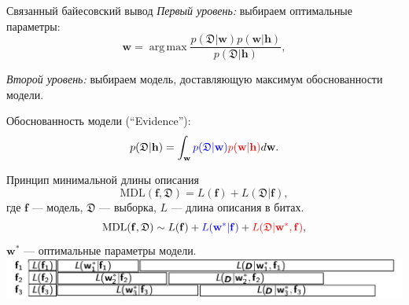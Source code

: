 \documentclass[usenames,dvipsnames,10pt,pdf,utf8,russian,aspectratio=43]{beamer}
\DeclareMathOperator*{\argmax}{arg\,max}
\begin{document}
\begin{frame}{Связанный байесовский вывод}
\textit{Первый уровень:} выбираем оптимальные параметры:
\[
    \mathbf{w} = \argmax \frac{p(\mathfrak{D}|\mathbf{w})p(\mathbf{w}|\mathbf{h})}{p(\mathfrak{D}|\mathbf{h})},
\]

\textit{Второй уровень:} выбираем модель, доставляющую максимум обоснованности модели.

Обоснованность модели (``Evidence''):
\[
	p(\mathfrak{D}|\mathbf{h}) = \int_\mathbf{w} \textcolor{blue}{p(\mathfrak{D}|\mathbf{w})}\textcolor{red}{p(\mathbf{w}|\mathbf{h})} d\mathbf{w}.
\]


\begin{figure}
  \centering
\label{fig:1}\qquad

\end{figure}

\end{frame}



\begin{frame}{Принцип минимальной длины описания}
\[
\text{MDL}(\mathbf{f}, \mathfrak{D}) = L(\mathbf{f}) + L(\mathfrak{D}|\mathbf{f}),
\]
где $\mathbf{f}$ --- модель, $\mathfrak{D}$ --- выборка, $L$ --- длина описания в битах.
\\
\[
\text{MDL}(\mathbf{f}, \mathfrak{D}) \sim L(\mathbf{f}) + \textcolor{blue}{L(\mathbf{w}^*| \mathbf{f})} + \textcolor{red}{L(\mathfrak{D}|\mathbf{w}^*, \mathbf{f})},
\]
$\mathbf{w}^*$ --- оптимальные параметры модели.\\

\includegraphics[width=\textwidth]{./mdl.png}

\end{frame}
\end{document}
